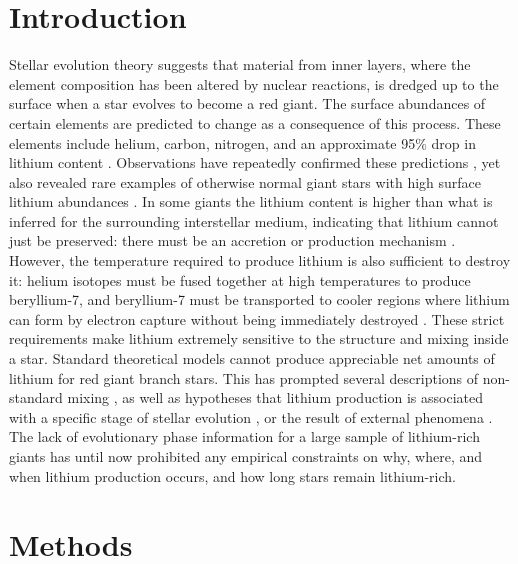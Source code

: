 \documentclass[twocolumn]{aastex62}
\begin{document}
\section{Introduction} \label{sec:intro}


Stellar evolution theory suggests that material from inner layers,
where the element composition has been altered by nuclear reactions, is
dredged up to the surface when a star evolves to become a red giant.
The surface abundances of certain elements are predicted to change as a
consequence of this process. These elements include helium, carbon, nitrogen, and 
an approximate 95\% drop in lithium content \citep{Iben_1967}. Observations have 
repeatedly confirmed these predictions \citep{Lambert_1981,Gilroy_1989,
Kirby_2016}, yet also revealed rare examples of otherwise normal giant stars
with high surface lithium abundances \citep[e.g.,][]{Martell_2013}. In some giants the lithium 
content is higher than what is inferred for the surrounding interstellar medium, indicating that
lithium cannot just be preserved: there must be an accretion or production 
mechanism \citep{Charbonnel_2000}. However, the temperature required to 
produce lithium is also sufficient to destroy it: helium isotopes must be 
fused together at high temperatures to produce beryllium-7, and beryllium-7
must be transported to cooler regions where lithium can form by 
electron capture without being immediately destroyed \citep{Cameron_1971}. %
These strict requirements make lithium extremely sensitive to the structure
and mixing inside a star. Standard theoretical models cannot produce
appreciable net amounts of lithium for red giant branch stars. This has prompted several descriptions of
non-standard mixing \citep{Sweigart_1979,Lattanzio_2014,Fekel_1993,Charbonnel_1995,
Sackmann_1999,Charbonnel_2000,Denissenkov_2003}, as well as hypotheses that
lithium production is associated with a specific stage of stellar
evolution \citep{Charbonnel_2000,Kumar_2011,Lattanzio_2014}, or the result 
of external phenomena \citep{Siess_1999,Andrievsky_1999,Denissenkov_2004}. 
The lack of evolutionary phase information for a large sample of
lithium-rich giants has until now prohibited any empirical constraints on why, where, 
and when lithium production occurs, and how long stars remain lithium-rich.


\section{Methods} \label{sec:methods}
\end{document}
